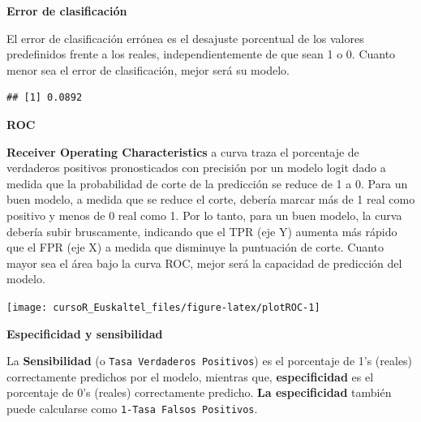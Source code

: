 \documentclass[]{book}
\newenvironment{Shaded}{\begin{snugshade}}{\end{snugshade}}
\newcommand{\KeywordTok}[1]{\textcolor[rgb]{0.13,0.29,0.53}{\textbf{#1}}}
\newcommand{\DataTypeTok}[1]{\textcolor[rgb]{0.13,0.29,0.53}{#1}}
\newcommand{\OperatorTok}[1]{\textcolor[rgb]{0.81,0.36,0.00}{\textbf{#1}}}
\newcommand{\NormalTok}[1]{#1}
\begin{document}
\textbf{Error de clasificación}

El error de clasificación errónea es el desajuste porcentual de los
valores predefinidos frente a los reales, independientemente de que sean
1 o 0. Cuanto menor sea el error de clasificación, mejor será su modelo.

\begin{Shaded}
\end{Shaded}

\begin{verbatim}
## [1] 0.0892
\end{verbatim}

\textbf{ROC}

\textbf{Receiver Operating Characteristics} a curva traza el porcentaje
de verdaderos positivos pronosticados con precisión por un modelo logit
dado a medida que la probabilidad de corte de la predicción se reduce de
1 a 0. Para un buen modelo, a medida que se reduce el corte, debería
marcar más de 1 real como positivo y menos de 0 real como 1. Por lo
tanto, para un buen modelo, la curva debería subir bruscamente,
indicando que el TPR (eje Y) aumenta más rápido que el FPR (eje X) a
medida que disminuye la puntuación de corte. Cuanto mayor sea el área
bajo la curva ROC, mejor será la capacidad de predicción del modelo.

\begin{Shaded}
\end{Shaded}

\begin{center}\texttt{[image: cursoR\_Euskaltel\_files/figure-latex/plotROC-1]} \end{center}

\textbf{Especificidad y sensibilidad}

La \textbf{Sensibilidad} (o \texttt{Tasa\ Verdaderos\ Positivos}) es el
porcentaje de 1's (reales) correctamente predichos por el modelo,
mientras que, \textbf{especificidad} es el porcentaje de 0's (reales)
correctamente predicho. \textbf{La especificidad} también puede
calcularse como \texttt{1-Tasa\ Falsos\ Positivos}.
\end{document}
